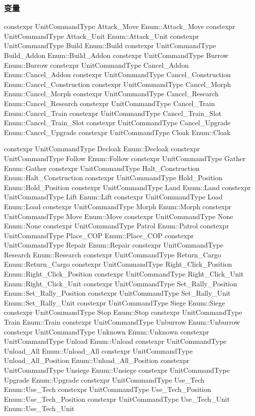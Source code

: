 \subsubsection{变量}
\begin{codebox}[变量]
constexpr UnitCommandType Attack_Move {Enum::Attack_Move}
constexpr UnitCommandType Attack_Unit {Enum::Attack_Unit}
constexpr UnitCommandType Build {Enum::Build}
constexpr UnitCommandType Build_Addon {Enum::Build_Addon}
constexpr UnitCommandType Burrow {Enum::Burrow}
constexpr UnitCommandType Cancel_Addon {Enum::Cancel_Addon}
constexpr UnitCommandType Cancel_Construction {Enum::Cancel_Construction}
constexpr UnitCommandType Cancel_Morph {Enum::Cancel_Morph}
constexpr UnitCommandType Cancel_Research {Enum::Cancel_Research}
constexpr UnitCommandType Cancel_Train {Enum::Cancel_Train}
constexpr UnitCommandType Cancel_Train_Slot {Enum::Cancel_Train_Slot}
constexpr UnitCommandType Cancel_Upgrade {Enum::Cancel_Upgrade}
constexpr UnitCommandType Cloak {Enum::Cloak}
\end{codebox}
\begin{codebox}[变量]
constexpr UnitCommandType Decloak {Enum::Decloak}
constexpr UnitCommandType Follow {Enum::Follow}
constexpr UnitCommandType Gather {Enum::Gather}
constexpr UnitCommandType Halt_Construction {Enum::Halt_Construction}
constexpr UnitCommandType Hold_Position {Enum::Hold_Position}
constexpr UnitCommandType Land {Enum::Land}
constexpr UnitCommandType Lift {Enum::Lift}
constexpr UnitCommandType Load {Enum::Load}
constexpr UnitCommandType Morph {Enum::Morph}
constexpr UnitCommandType Move {Enum::Move}
constexpr UnitCommandType None {Enum::None}
constexpr UnitCommandType Patrol {Enum::Patrol}
constexpr UnitCommandType Place_COP {Enum::Place_COP}
constexpr UnitCommandType Repair {Enum::Repair}
constexpr UnitCommandType Research {Enum::Research}
constexpr UnitCommandType Return_Cargo {Enum::Return_Cargo}
constexpr UnitCommandType Right_Click_Position {Enum::Right_Click_Position}
constexpr UnitCommandType Right_Click_Unit {Enum::Right_Click_Unit}
constexpr UnitCommandType Set_Rally_Position {Enum::Set_Rally_Position}
constexpr UnitCommandType Set_Rally_Unit {Enum::Set_Rally_Unit}
constexpr UnitCommandType Siege {Enum::Siege}
constexpr UnitCommandType Stop {Enum::Stop}
constexpr UnitCommandType Train {Enum::Train}
constexpr UnitCommandType Unburrow {Enum::Unburrow}
constexpr UnitCommandType Unknown {Enum::Unknown}
constexpr UnitCommandType Unload {Enum::Unload}
constexpr UnitCommandType Unload_All {Enum::Unload_All}
constexpr UnitCommandType Unload_All_Position {Enum::Unload_All_Position}
constexpr UnitCommandType Unsiege {Enum::Unsiege}
constexpr UnitCommandType Upgrade {Enum::Upgrade}
constexpr UnitCommandType Use_Tech {Enum::Use_Tech}
constexpr UnitCommandType Use_Tech_Position {Enum::Use_Tech_Position}
constexpr UnitCommandType Use_Tech_Unit {Enum::Use_Tech_Unit}
\end{codebox}
